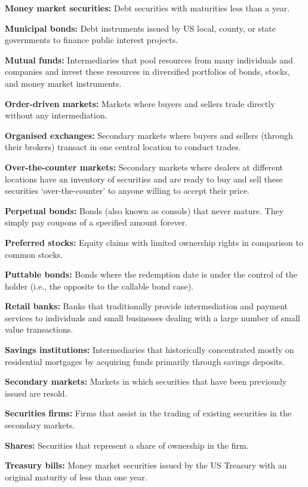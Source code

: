 \documentclass[twoside,openany]{book}
\begin{document}
\textbf{Money market securities:} Debt securities with maturities less than a year.

\textbf{Municipal bonds:} Debt instruments issued by US local, county, or state governments to finance public interest projects.

\textbf{Mutual funds:} Intermediaries that pool resources from many individuals and companies and invest these resources in diversified portfolios of bonds, stocks, and money market instruments.

\textbf{Order-driven markets:} Markets where buyers and sellers trade directly without any intermediation.

\textbf{Organised exchanges:} Secondary markets where buyers and sellers (through their brokers) transact in one central location to conduct trades.

\textbf{Over-the-counter markets:} Secondary markets where dealers at different locations have an inventory of securities and are ready to buy and sell these securities ‘over-the-counter' to anyone willing to accept their price.

\textbf{Perpetual bonds:} Bonds (also known as consols) that never mature. They simply pay coupons of a specified amount forever.

\textbf{Preferred stocks:} Equity claims with limited ownership rights in comparison to common stocks.

\textbf{Puttable bonds:} Bonds where the redemption date is under the control of the holder (i.e., the opposite to the callable bond case).

\textbf{Retail banks:} Banks that traditionally provide intermediation and payment services to individuals and small businesses dealing with a large number of small value transactions.

\textbf{Savings institutions:} Intermediaries that historically concentrated mostly on residential mortgages by acquiring funds primarily through savings deposits.

\textbf{Secondary markets:} Markets in which securities that have been previously issued are resold.

\textbf{Securities firms:} Firms that assist in the trading of existing securities in the secondary markets.

\textbf{Shares:} Securities that represent a share of ownership in the firm.

\textbf{Treasury bills:} Money market securities issued by the US Treasury with an original maturity of less than one year.
\end{document}

